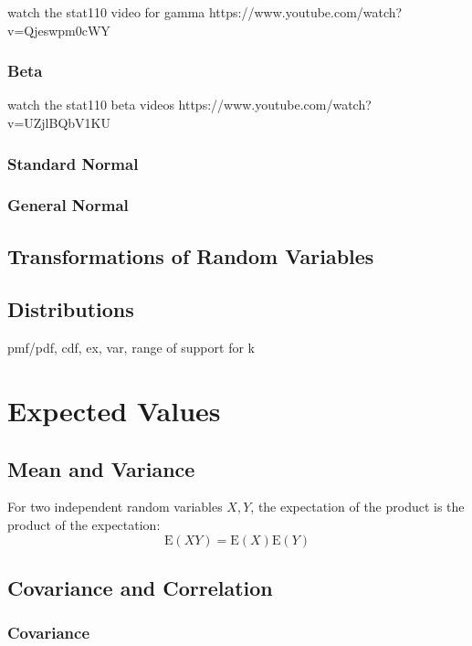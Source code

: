 \documentclass[a4paper,10pt]{article}
\newcommand{\E}{\mathrm{E}}
\begin{document}
{\huge watch the stat110 video for gamma https://www.youtube.com/watch?v=Qjeswpm0cWY}

\subsubsection{Beta}

{\huge watch the stat110 beta videos https://www.youtube.com/watch?v=UZjlBQbV1KU}

\subsubsection{Standard Normal}

\subsubsection{General Normal}

\subsection{Transformations of Random Variables}

\subsection{Distributions}
pmf/pdf, cdf, ex, var, range of support for k


\newpage
\section{Expected Values}

\subsection{Mean and Variance}
For two independent random variables $X, Y$, the expectation of the product is the product of the expectation:
\begin{equation*}
    \E(XY) = \E(X)\E(Y)
\end{equation*}

\subsection{Covariance and Correlation}

\subsubsection{Covariance}
\end{document}

